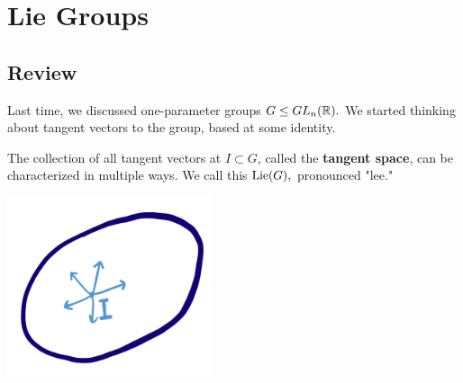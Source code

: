 
\section{Lie Groups}

\subsection{Review}
Last time, we discussed one-parameter groups $G \leq GL_n(\mathbb R).$ We started thinking about tangent vectors to the group, based at some identity.

\begin{definition}
The collection of all tangent vectors at $I \subset G$, called the \textbf{tangent space}, can be characterized in multiple ways. We call this $\operatorname{Lie}(G),$ pronounced "lee." 
\end{definition}

\begin{center}
    \includegraphics[width=6cm]{Lecture Files and Images/lec33-1.png}
\end{center}

